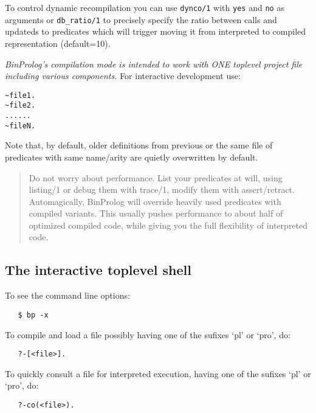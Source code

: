 \documentclass{article}
\begin{document}
To control dynamic recompilation you can use {\tt dynco/1} with {\tt yes}
and {\tt no} as arguments or {\tt db\_ratio/1} to precisely specify
the ratio between calls and updateds to predicates which will
trigger moving it from interpreted to compiled representation
(default=10).

{\em BinProlog's compilation mode is intended to work with ONE toplevel
project file including various components.} For interactive development
use: 

\begin{verbatim}
~file1.
~file2.
......
~fileN.
\end{verbatim}

\noindent Note that, by default, older definitions from previous or the same file
of predicates with same name/arity are quietly overwritten by default.

\begin{quote}
Do not worry about performance. List your predicates at will, using listing/1 or debug them with trace/1, modify them with assert/retract. 
Automagically, BinProlog will
override heavily used predicates with compiled variants. This usually
pushes performance to about half of optimized compiled code, while
giving you the full flexibility of interpreted code.
\end{quote}

\subsection{The interactive toplevel shell}

To see the command line options:

\begin{verbatim}
   $ bp -x
\end{verbatim}

{\flushleft To} compile and load a file possibly having one of
the sufixes `pl' or `pro', do:

\begin{verbatim}
   ?-[<file>].
\end{verbatim}

{\flushleft To} quickly consult a file for interpreted execution, having one of
the sufixes `pl' or `pro', do:

\begin{verbatim}
   ?-co(<file>).
\end{verbatim}
\end{document}
